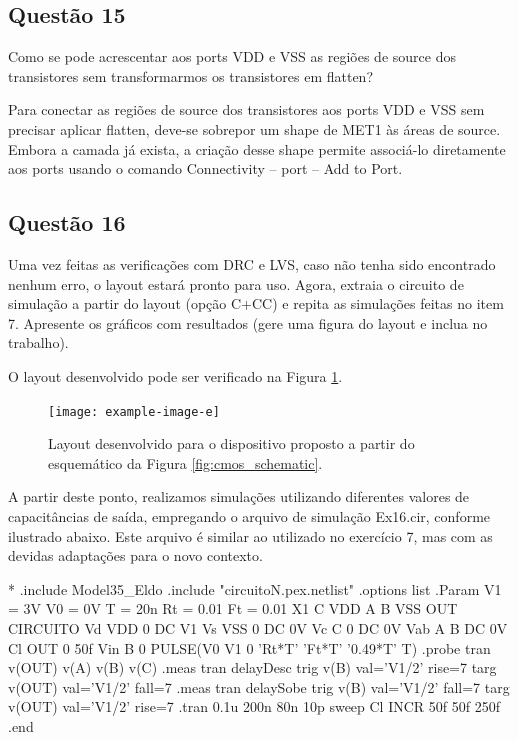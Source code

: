 \documentclass[12pt,a4paper]{article}
\begin{document}
\subsection*{Questão 15}

Como se pode acrescentar aos ports VDD e VSS as regiões de source dos transistores sem transformarmos os transistores em flatten?

Para conectar as regiões de source dos transistores aos ports VDD e VSS sem precisar aplicar flatten, deve-se sobrepor um shape de MET1 às áreas de source. Embora a camada já exista, a criação desse shape permite associá-lo diretamente aos ports usando o comando Connectivity -- port -- Add to Port.

\subsection*{Questão 16}

Uma vez feitas as verificações com DRC e LVS, caso não tenha sido encontrado nenhum erro, o layout estará pronto para uso. Agora, extraia o circuito de simulação a partir do layout (opção C+CC) e repita as simulações feitas no item 7. Apresente os gráficos com resultados (gere uma figura do layout e inclua no trabalho).

O layout desenvolvido pode ser verificado na Figura \ref{fig:layout_developed}.

\begin{figure}[H]
    \centering
    \texttt{[image: example-image-e]}
    \caption{Layout desenvolvido para o dispositivo proposto a partir do esquemático da Figura \ref{fig:cmos_schematic}.}
    \label{fig:layout_developed}
\end{figure}

A partir deste ponto, realizamos simulações utilizando diferentes valores de capacitâncias de saída, empregando o arquivo de simulação Ex16.cir, conforme ilustrado abaixo. Este arquivo é similar ao utilizado no exercício 7, mas com as devidas adaptações para o novo contexto.

\begin{codeblock}[title={Exemplo de Simulação}, label={lst:simulation_example}, listing options={language=TeX}]
*
.include Model35_Eldo
.include "circuitoN.pex.netlist"
.options list
.Param V1 = 3V V0 = 0V T = 20n Rt = 0.01 Ft = 0.01
X1 C VDD A B VSS OUT CIRCUITO
Vd VDD 0 DC V1
Vs VSS 0 DC 0V
Vc C 0 DC 0V
Vab A B DC 0V
Cl OUT 0 50f
Vin B 0 PULSE(V0 V1 0 'Rt*T' 'Ft*T' '0.49*T' T)
.probe tran v(OUT) v(A) v(B) v(C)
.meas tran delayDesc trig v(B) val='V1/2' rise=7 targ v(OUT) val='V1/2'
fall=7
.meas tran delaySobe trig v(B) val='V1/2' fall=7 targ v(OUT) val='V1/2'
rise=7
.tran 0.1u 200n 80n 10p sweep Cl INCR 50f 50f 250f
.end
\end{codeblock}
\end{document}
